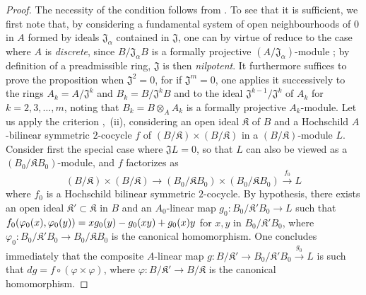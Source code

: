 \begin{proof}
The necessity of the condition follows from .
To see that it is sufficient, we first note that, by considering a fundamental system of open neighbourhoods of $0$ in $A$ formed by ideals $\mathfrak{J}_\alpha$ contained in $\mathfrak{J}$, one can by virtue of  reduce to the case where $A$ is \emph{discrete}, since $B/\mathfrak{J}_\alpha B$ is a formally projective $(A/\mathfrak{J}_\alpha)$-module ;
by definition of a preadmissible ring, $\mathfrak{J}$ is then \emph{nilpotent}.
It furthermore suffices to prove the proposition when $\mathfrak{J}^2=0$, for if $\mathfrak{J}^m=0$, one applies it successively to the rings $A_k=A/\mathfrak{J}^k$ and $B_k=B/\mathfrak{J}^k B$ and to the ideal $\mathfrak{J}^{k-1}/\mathfrak{J}^k$ of $A_k$ for $k=2,3,\ldots,m$, noting  that $B_k=B\otimes_A A_k$ is a formally projective $A_k$-module.
Let us apply the criterion ,~(ii), considering an open ideal $\mathfrak K$ of $B$ and a Hochschild $A$-bilinear symmetric $2$-cocycle $f$ of $(B/\mathfrak K)\times(B/\mathfrak K)$ in a $(B/\mathfrak K)$-module $L$.
Consider first the special case where $\mathfrak{J}L=0$, so that $L$ can also be viewed as a $(B_0/\mathfrak KB_0)$-module, and $f$ factorizes as
\[
  (B/\mathfrak K)\times(B/\mathfrak K) \to (B_0/\mathfrak KB_0)\times(B_0/\mathfrak KB_0) \xrightarrow{f_0} L
\]
where $f_0$ is a Hochschild bilinear symmetric $2$-cocycle.
By hypothesis, there exists an open ideal $\mathfrak K'\subset\mathfrak K$ in $B$ and an $A_0$-linear map $g_0:B_0/\mathfrak K'B_0\to L$ such that $f_0(\varphi_0(x),\varphi_0(y))=xg_0(y)- g_0(xy)+g_0(x)y$ for $x,y$ in $B_0/\mathfrak K'B_0$, where $\varphi_0:B_0/\mathfrak K'B_0\to B_0/\mathfrak KB_0$ is the canonical homomorphism.
One concludes immediately that the composite $A$-linear map $g:B/\mathfrak K'\to B_0/\mathfrak K'B_0\xrightarrow{g_0}L$ is such that $dg=f\circ(\varphi\times\varphi)$, where $\varphi:B/\mathfrak K'\to B/\mathfrak K$ is the canonical homomorphism.


\end{proof}
